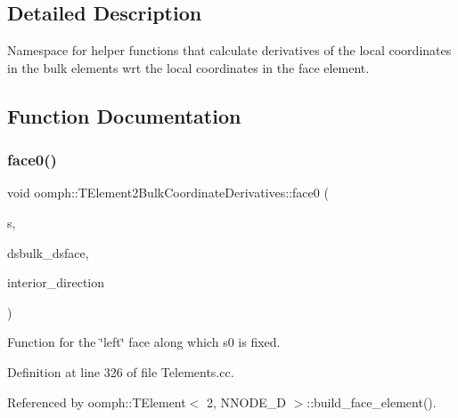 \subsection{Detailed Description}
Namespace for helper functions that calculate derivatives of the local coordinates in the bulk elements wrt the local coordinates in the face element. 

\subsection{Function Documentation}
\mbox{\label{namespaceoomph_1_1TElement2BulkCoordinateDerivatives_a594aa906862feecca4a94fb1b5828539}} 
\subsubsection{\texorpdfstring{face0()}{face0()}}
{\footnotesize\ttfamily void oomph\+::\+T\+Element2\+Bulk\+Coordinate\+Derivatives\+::face0 (\begin{DoxyParamCaption}\item[{const \hyperlink{classoomph_1_1Vector}{Vector}$<$ double $>$ \&}]{s,  }\item[{\hyperlink{classoomph_1_1DenseMatrix}{Dense\+Matrix}$<$ double $>$ \&}]{dsbulk\+\_\+dsface,  }\item[{unsigned \&}]{interior\+\_\+direction }\end{DoxyParamCaption})}



Function for the \char`\"{}left\char`\"{} face along which s0 is fixed. 



Definition at line 326 of file Telements.\+cc.



Referenced by oomph\+::\+T\+Element$<$ 2, N\+N\+O\+D\+E\+\_\+D $>$\+::build\+\_\+face\+\_\+element().

\mbox{\label{namespaceoomph_1_1TElement2BulkCoordinateDerivatives_ac0a6a95ed65ef054e597a3defc274644}} 
